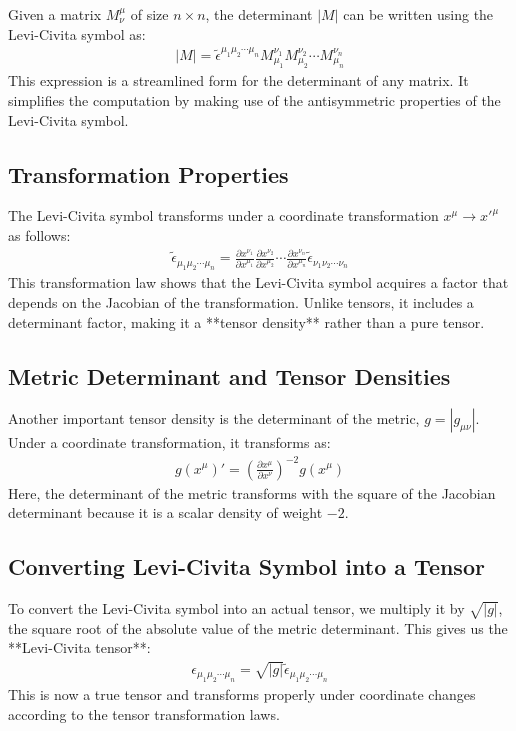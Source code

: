 \documentclass[12pt]{book}
\begin{document}
Given a matrix \( M^\mu_{\nu} \) of size \( n \times n \), the determinant \( |M| \) can be written using the Levi-Civita symbol as:
\begin{align}
|M| = \tilde{\epsilon}^{\mu_1 \mu_2 \cdots \mu_n} M^{\nu_1}_{\mu_1} M^{\nu_2}_{\mu_2} \cdots M^{\nu_n}_{\mu_n}
\end{align}
This expression is a streamlined form for the determinant of any matrix. It simplifies the computation by making use of the antisymmetric properties of the Levi-Civita symbol.

\subsection{Transformation Properties}

The Levi-Civita symbol transforms under a coordinate transformation \( x^{\mu} \rightarrow x'^{\mu} \) as follows:
\begin{align}
\tilde{\epsilon}_{\mu_1 \mu_2 \cdots \mu_n} = \frac{\partial x^{\nu_1}}{\partial x^{\mu_1}} \frac{\partial x^{\nu_2}}{\partial x^{\mu_2}} \cdots \frac{\partial x^{\nu_n}}{\partial x^{\mu_n}} \tilde{\epsilon}_{\nu_1 \nu_2 \cdots \nu_n}
\end{align}
This transformation law shows that the Levi-Civita symbol acquires a factor that depends on the Jacobian of the transformation. Unlike tensors, it includes a determinant factor, making it a **tensor density** rather than a pure tensor.

\subsection{Metric Determinant and Tensor Densities}

Another important tensor density is the determinant of the metric, \( g = |g_{\mu\nu}| \). Under a coordinate transformation, it transforms as:
\begin{align}
g(x^\mu)' = \left( \frac{\partial x^\mu}{\partial x^\nu} \right)^{-2} g(x^\mu)
\end{align}
Here, the determinant of the metric transforms with the square of the Jacobian determinant because it is a scalar density of weight \( -2 \).

\subsection{Converting Levi-Civita Symbol into a Tensor}

To convert the Levi-Civita symbol into an actual tensor, we multiply it by \( \sqrt{|g|} \), the square root of the absolute value of the metric determinant. This gives us the **Levi-Civita tensor**:
\begin{align}
\epsilon_{\mu_1 \mu_2 \cdots \mu_n} = \sqrt{|g|} \tilde{\epsilon}_{\mu_1 \mu_2 \cdots \mu_n}
\end{align}
This is now a true tensor and transforms properly under coordinate changes according to the tensor transformation laws.
\end{document}
